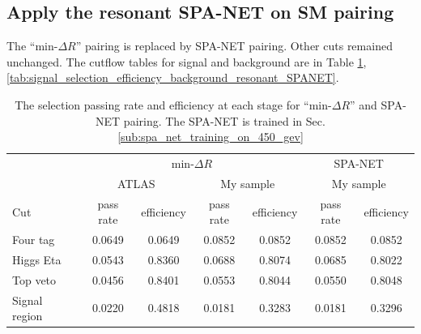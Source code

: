 \documentclass[12pt]{article}
\begin{document}
	\subsection{Apply the resonant SPA-NET on SM pairing}%
	\label{sub:apply_the_resonant_spa_net_on_sm_pairing}
		The ``$ \text{min-}\Delta R$'' pairing is replaced by SPA-NET pairing. Other cuts remained unchanged. The cutflow tables for signal and background are in Table \ref{tab:signal_selection_efficiency_resonant_SPANET}, \ref{tab:signal_selection_efficiency_background_resonant_SPANET}.
		\begin{table}[htpb]
			\centering
			\caption{The selection passing rate and efficiency at each stage for ``$\text{min-}\Delta R$'' and SPA-NET pairing. The SPA-NET is trained in Sec.\ref{sub:spa_net_training_on_450_gev}}
			\label{tab:signal_selection_efficiency_resonant_SPANET}
			\begin{tabular}{l|cc|cc|cc}
					& \multicolumn{4}{c|}{$\text{min-}\Delta R$}                               & \multicolumn{2}{c}{SPA-NET}   \\
							  & \multicolumn{2}{c|}{ATLAS} & \multicolumn{2}{c|}{My sample}             & \multicolumn{2}{c}{My sample} \\
				Cut           & pass rate   & efficiency  & pass rate & \multicolumn{1}{c|}{efficiency} & pass rate     & efficiency    \\ \hline
				Four tag      & 0.0649 & 0.0649 & 0.0852 & 0.0852 & 0.0852 & 0.0852\\
				Higgs Eta     & 0.0543 & 0.8360 & 0.0688 & 0.8074 & 0.0685 & 0.8022\\
				Top veto      & 0.0456 & 0.8401 & 0.0553 & 0.8044 & 0.0550 & 0.8048\\
				Signal region & 0.0220 & 0.4818 & 0.0181 & 0.3283 & 0.0181 & 0.3296\\
			\end{tabular}
		\end{table}
\end{document}
